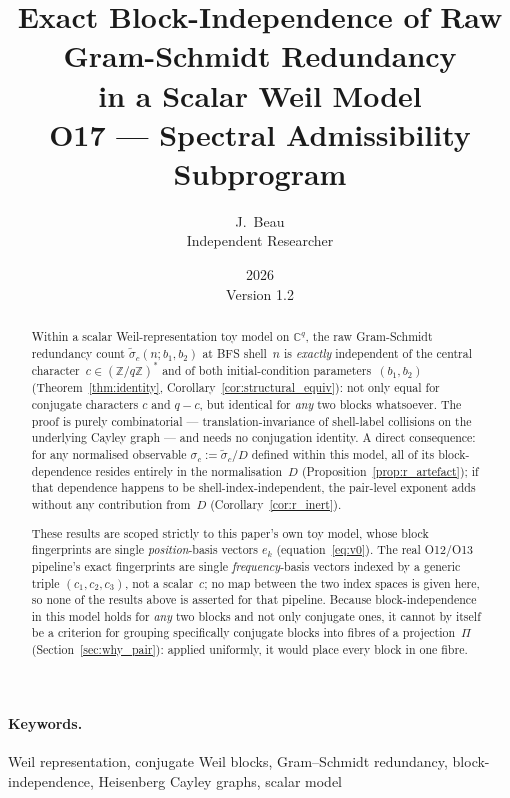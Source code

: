 \documentclass[11pt,a4paper]{article}
\title{Exact Block-Independence of Raw Gram-Schmidt Redundancy\\
in a Scalar Weil Model\\
\large O17 --- Spectral Admissibility Subprogram}
\author{J.~Beau\\
\small Independent Researcher}
\date{2026\\Version 1.2}
\theoremstyle{definition}
\newcommand{\Fq}{(\mathbb{Z}/q\mathbb{Z})^*}
\begin{document}
  \maketitle

  \begin{abstract}
    \vspace{0.5em}
    Within a scalar Weil-representation toy model on $\mathbb{C}^q$, the
    raw Gram-Schmidt redundancy count $\tilde\sigma_c(n;b_1,b_2)$ at BFS
    shell~$n$ is \emph{exactly} independent of the central
    character~$c \in \Fq$ and of both initial-condition
    parameters~$(b_1,b_2)$ (Theorem~\ref{thm:identity},
    Corollary~\ref{cor:structural_equiv}): not only equal for conjugate
    characters $c$ and $q-c$, but identical for \emph{any} two blocks
    whatsoever.
    The proof is purely combinatorial --- translation-invariance of
    shell-label collisions on the underlying Cayley graph --- and needs
    no conjugation identity.
    A direct consequence: for any normalised observable
    $\sigma_c := \tilde\sigma_c/D$ defined within this model, all of its
    block-dependence resides entirely in the normalisation~$D$
    (Proposition~\ref{prop:r_artefact}); if that dependence happens to be
    shell-index-independent, the pair-level exponent adds without any
    contribution from~$D$ (Corollary~\ref{cor:r_inert}).

    These results are scoped strictly to this paper's own toy model,
    whose block fingerprints are single \emph{position}-basis vectors
    $e_k$ (equation~\eqref{eq:v0}).
    The real O12/O13 pipeline's exact fingerprints are single
    \emph{frequency}-basis vectors indexed by a generic triple
    $(c_1,c_2,c_3)$, not a scalar~$c$; no map between the two index
    spaces is given here, so none of the results above is asserted for
    that pipeline.
    Because block-independence in this model holds for \emph{any} two
    blocks and not only conjugate ones, it cannot by itself be a
    criterion for grouping specifically conjugate blocks into fibres of a
    projection~$\Pi$ (Section~\ref{sec:why_pair}): applied uniformly, it
    would place every block in one fibre.
  \end{abstract}

  \paragraph{Keywords.}
    Weil representation, conjugate Weil blocks, Gram--Schmidt redundancy, block-independence, Heisenberg Cayley graphs,
    scalar model
\end{document}
